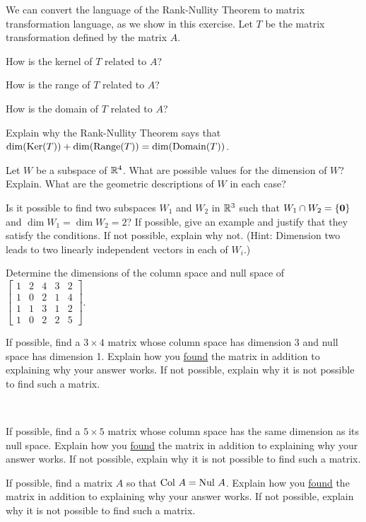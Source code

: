 \item We can convert the language of the Rank-Nullity Theorem to matrix transformation language, as we show in this exercise. Let $T$ be the matrix transformation defined by the matrix $A$. 
	\ba
	\item How is the kernel of $T$ related to $A$?
	\item How is the range of $T$ related to $A$?
	\item How is the domain of $T$ related to $A$?
	\item Explain why the Rank-Nullity Theorem says that $\dim(\text{Ker}(T)) + \dim(\text{Range}(T)) = \dim(\text{Domain}(T))$.
	\ea


\item Let $W$ be a subspace of $\mathbb{R}^4$. What are possible values for the dimension of $W$? Explain. What are the geometric descriptions of $W$ in each case?

\item Is it possible to find two subspaces $W_1$ and $W_2$ in $\mathbb{R}^3$ such that $W_1 \cap W_2=\{ \mathbf{0} \}$ and $\dim W_1=\dim W_2=2$? If possible, give an example and justify that they satisfy the conditions. If not possible, explain why not. (Hint: Dimension two leads to two linearly independent vectors in each of $W_i$.)

\item Determine the dimensions of the column space and null space of $\left[ \begin{array}{ccccc} 1&2&4&3&2 \\ 1&0&2&1&4 \\ 1&1&3&1&2 \\ 1&0&2&2&5 \end{array} \right]$. 

\item If possible, find a $3\times 4$ matrix whose column space has dimension 3 and null space has dimension 1. Explain how you \underline{found} the matrix in addition to explaining why your answer works. If not possible, explain why it is not possible to find such a matrix.

\item ~
	\ba
	\item If possible, find a $5\times 5$ matrix whose column space has the same dimension as its null space. Explain how you \underline{found} the matrix in addition to explaining why your answer works. If not possible, explain why it is not possible to find such a matrix.


	\item If possible, find a matrix $A$ so that $\text{Col } A = \text{Nul } A$. Explain how you \underline{found} the matrix in addition to explaining why your answer works. If not possible, explain why it is not possible to find such a matrix.


